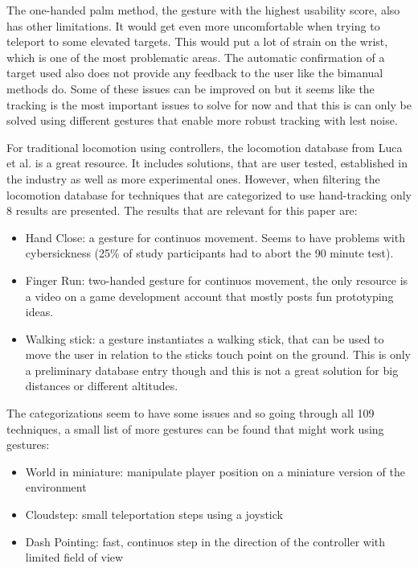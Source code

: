 The one-handed palm method, the gesture with the highest usability score, also has other limitations. It would get even more uncomfortable when trying to teleport to some elevated targets. This would put a lot of strain on the wrist, which is one of the most problematic areas. The automatic confirmation of a target used also does not provide any feedback to the user like the bimanual methods do. Some of these issues can be improved on but it seems like the tracking is the most important issues to solve for now and that this is can only be solved using different gestures that enable more robust tracking with lest noise.

For traditional locomotion using controllers, the locomotion database from Luca et al. \cite{Luca} is a great resource. It includes solutions, that are user tested, established in the industry as well as more experimental ones. However, when filtering the locomotion database for techniques that are categorized to use hand-tracking only 8 results are presented.
The results that are relevant for this paper are:

\begin{itemize}
\item
  Hand Close: a gesture for continuos movement. Seems to have problems
  with cybersickness (25\% of study participants had to
  abort the 90 minute test). \cite{Huang}
\item
  Finger Run: two-handed gesture for continuos movement, the only
  resource is a video on a game development account that mostly posts fun
  prototyping ideas. \cite{Beauchamp}
\item
  Walking stick: a gesture instantiates a walking stick, that can be
  used to move the user in relation to the sticks touch point on the
  ground. This is only a preliminary database entry though and this is
  not a great solution for big distances or different altitudes. %
\end{itemize}

The categorizations seem to have some issues and so going through all
109 techniques, a small list of more gestures can be found that might work using gestures:

\begin{itemize}
\itemsep1pt\parskip0pt
\item
  World in miniature: manipulate player position on a miniature version of the environment
\item
  Cloudstep: small teleportation steps using a joystick
\item
  Dash Pointing: fast, continuos step in the direction of the controller with limited field of view
\end{itemize}

